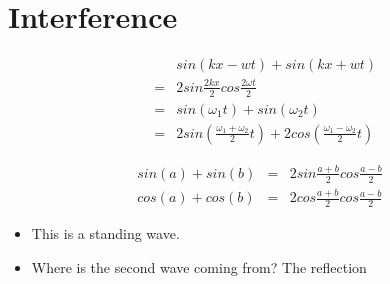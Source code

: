 \documentclass{article}
\begin{document}
\section{Interference}
\begin{eqnarray*}
& & sin(kx - wt) + sin (kx + wt) \\
& = & 2 sin \frac{2kx}{2} cos {\frac{2 \omega t}{2}} \\
& = & sin (\omega_1 t) + sin (\omega_2 t) \\
& = & 2 sin (\frac{\omega_1 + \omega_2}{2}t) + 2 cos (\frac{\omega_1 - \omega_2}{2}t)
\end{eqnarray*}

\begin{eqnarray*}
sin(a) + sin(b) & = & 2 sin \frac{a+b}{2} cos \frac{a - b}{2} \\
cos(a) + cos(b) & = &  2 cos \frac{a+b}{2} cos \frac{a - b}{2}
\end{eqnarray*}

\begin{itemize}
\item This is a standing wave.
\item Where is the second wave coming from? The reflection

\end{itemize}
\end{document}
